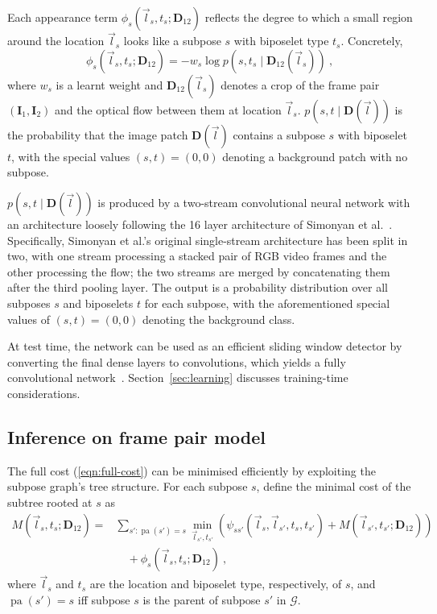 \documentclass[runningheads]{llncs}
\newcommand{\mat}{\mathbf}
\DeclareMathOperator{\pa}{pa}
\begin{document}
Each appearance term $\phi_s(\vec l_s, t_s; \mat D_{12})$ reflects the degree to
which a small region around the location $\vec l_s$ looks like a subpose $s$
with biposelet type $t_s$. Concretely,
\begin{equation}\label{eqn:unary-cost}
\phi_s(\vec l_s, t_s; \mat D_{12}) = -w_s \log p(s, t_s \mid \mat D_{12}(
\vec l_s))~,
\end{equation}
%
where $w_s$ is a learnt weight and $\mat D_{12}(\vec l_s)$ denotes a crop of the
frame pair $(\mat I_1, \mat I_2)$ and the optical flow between them at location
$\vec l_s$. $p(s, t \mid \mat D(\vec l))$ is the probability that the image
patch $\mat D(\vec l)$ contains a subpose $s$ with biposelet $t$, with the
special values $(s, t) = (0, 0)$ denoting a background patch with no subpose.

$p(s, t \mid \mat D(\vec l))$ is produced by a two-stream convolutional neural
network with an architecture loosely following the 16 layer architecture of
Simonyan et al.~\cite{simonyan2014very}. Specifically, Simonyan et al.'s
original single-stream architecture has been split in two, with one stream
processing a stacked pair of RGB video frames and the other processing the flow;
the two streams are merged by concatenating them after the third pooling layer.
The output is a probability distribution over all subposes $s$ and biposelets
$t$ for each subpose, with the aforementioned special values of $(s, t) = (0,
0)$ denoting the background class.

At test time, the network can be used as an efficient sliding window detector by
converting the final dense layers to convolutions, which yields a fully
convolutional network~\cite{sermanet2013overfeat}. Section~\ref{sec:learning}
discusses training-time considerations.

\subsection{Inference on frame pair model}\label{sec:frame-pair-inference}

The full cost (\ref{eqn:full-cost}) can be minimised efficiently by exploiting
the subpose graph's tree structure. For each subpose $s$, define the minimal
cost of the subtree rooted at $s$ as
%
\begin{equation}\label{eqn:reccost}
\begin{split}
M(\vec l_s, t_s; \mat D_{12}) =
&\sum_{s' : \pa(s') = s} \min_{\vec l_{s'}, t_{s'}} \left(\psi_{s s'}(\vec l_s,
\vec l_{s'}, t_s, t_{s'}) + M(\vec l_{s'}, t_{s'}; \mat D_{12})\right)
\\&\quad+ \phi_s(\vec l_s, t_s; \mat D_{12})~,
\end{split}
\end{equation}
%
where $\vec l_s$ and $t_s$ are the location and biposelet type, respectively, of
$s$, and $\pa(s') = s$ iff subpose $s$ is the parent of subpose $s'$ in
$\mathcal G$.
\end{document}
